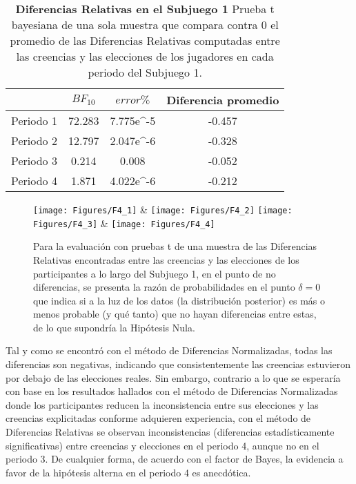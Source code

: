 \begin{table}[h]
\caption[Diferencias Relativas en el Subjuego 1 (prueba t de una muestra)]{\textbf{Diferencias Relativas en el Subjuego 1} Prueba t bayesiana de una sola muestra que compara contra 0 el promedio de las Diferencias Relativas computadas entre las creencias y las elecciones de los jugadores en cada periodo del Subjuego 1.}
\label{DR-S1-B}
\centering
\begin{tabular}{l | c c | c}
\toprule
\textbf{} & \textbf{$BF_{10}$} & \textbf{$error\%$} & \textbf{Diferencia promedio}\\
\midrule
Periodo 1 & 72.283 & 7.775e^-5 & -0.457\\
Periodo 2 & 12.797 & 2.047e^-6 & -0.328\\
Periodo 3 & 0.214 & 0.008 & -0.052\\
Periodo 4 & 1.871 & 4.022e^-6 & -0.212\\
\bottomrule
\end{tabular}
\end{table}
	


\begin{figure}[hp]
\centering
\texttt{[image: Figures/F4\_1]} & \texttt{[image: Figures/F4\_2]} 
\texttt{[image: Figures/F4\_3]} & \texttt{[image: Figures/F4\_4]} 
\decoRule
\caption[Diferencias Relativas entre creencias y elecciones en el Subjuego 1 (Factor de Bayes)]{Para la evaluación con pruebas t de una muestra de las Diferencias Relativas encontradas entre las creencias y las elecciones de los participantes a lo largo del Subjuego 1, en el punto de no diferencias, se presenta la razón de probabilidades en el punto $\delta = 0$ que indica si a la luz de los datos (la distribución posterior) es más o menos probable (y qué tanto) que no hayan diferencias entre estas, de lo que supondría la Hipótesis Nula.}
\label{fig:DR_S1}
\end{figure}

Tal y como se encontró con el método de Diferencias Normalizadas, todas las diferencias son negativas, indicando que consistentemente las creencias estuvieron por debajo de las elecciones reales. Sin embargo, contrario a lo que se esperaría con base en los resultados hallados con el método de Diferencias Normalizadas donde los participantes reducen la inconsistencia entre sus elecciones y las creencias explicitadas conforme adquieren experiencia, con el método de Diferencias Relativas se observan inconsistencias (diferencias estadísticamente significativas) entre creencias y elecciones en el periodo 4, aunque no en el periodo 3. De cualquier forma, de acuerdo con el factor de Bayes, la evidencia a favor de la hipótesis alterna en el periodo 4 es anecdótica.\\

